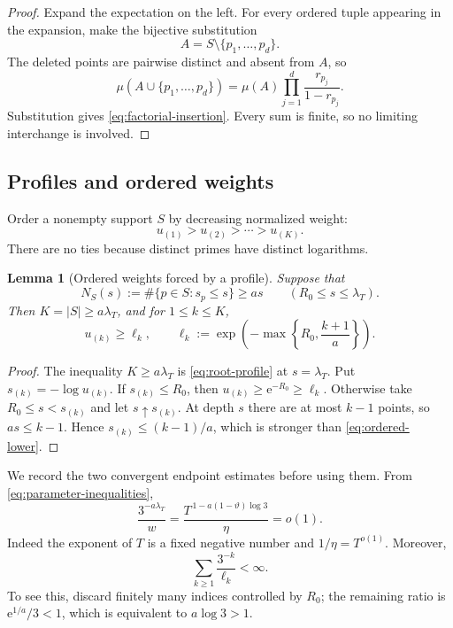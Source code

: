 \documentclass[11pt]{article}
\numberwithin{equation}{section}
\theoremstyle{plain}
\newtheorem{lemma}[theorem]{Lemma}
\newcommand{\1}{\mathbf 1}
\newcommand{\e}{\mathrm e}
\begin{document}
\begin{proof}
Expand the expectation on the left.  For every ordered tuple appearing in
the expansion, make the bijective substitution
\[
 A=S\setminus\{p_1,\ldots,p_d\}.
\]
The deleted points are pairwise distinct and absent from $A$, so
\[
 \mu(A\cup\{p_1,\ldots,p_d\})
 =\mu(A)\prod_{j=1}^d\frac{r_{p_j}}{1-r_{p_j}}.
\]
Substitution gives \eqref{eq:factorial-insertion}.  Every sum is finite, so
no limiting interchange is involved.
\end{proof}

\subsection{Profiles and ordered weights}

Order a nonempty support $S$ by decreasing normalized weight:
\[
 u_{(1)}>u_{(2)}>\cdots>u_{(K)}.
\]
There are no ties because distinct primes have distinct logarithms.

\begin{lemma}[Ordered weights forced by a profile]
\label{lem:ordered-profile}
Suppose that
\begin{equation}\label{eq:root-profile}
 N_S(s):=\#\{p\in S:s_p\le s\}\ge as
 \qquad(R_0\le s\le\lambda_T).
\end{equation}
Then $K=|S|\ge a\lambda_T$, and for $1\le k\le K$,
\begin{equation}\label{eq:ordered-lower}
 u_{(k)}\ge\ell_k,
 \qquad
 \ell_k:=
 \exp\!\left(
 -\max\left\{R_0,\frac{k+1}{a}\right\}
 \right).
\end{equation}
\end{lemma}

\begin{proof}
The inequality $K\ge a\lambda_T$ is
\eqref{eq:root-profile} at $s=\lambda_T$.  Put
$s_{(k)}=-\log u_{(k)}$.  If $s_{(k)}\le R_0$, then
$u_{(k)}\ge\e^{-R_0}\ge\ell_k$.  Otherwise take
$R_0\le s<s_{(k)}$ and let $s\uparrow s_{(k)}$.  At depth $s$ there are at
most $k-1$ points, so $as\le k-1$.  Hence
$s_{(k)}\le(k-1)/a$, which is stronger than
\eqref{eq:ordered-lower}.
\end{proof}

We record the two convergent endpoint estimates before using them.  From
\eqref{eq:parameter-inequalities},
\begin{equation}\label{eq:endpoint-decay}
 \frac{3^{-a\lambda_T}}{w}
 =
 \frac{T^{\,1-a(1-\vartheta)\log3}}{\eta}
 =o(1).
\end{equation}
Indeed the exponent of $T$ is a fixed negative number and
$1/\eta=T^{o(1)}$.  Moreover,
\begin{equation}\label{eq:rank-series}
 \sum_{k\ge1}\frac{3^{-k}}{\ell_k}<\infty.
\end{equation}
To see this, discard finitely many indices controlled by $R_0$; the
remaining ratio is $\e^{1/a}/3<1$, which is equivalent to
$a\log3>1$.
\end{document}
